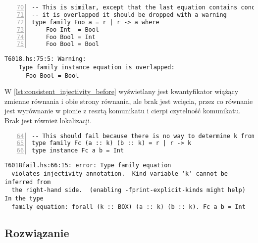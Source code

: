 \begin{lstlisting}[float,numbers=left,firstnumber=70,label={lst:consistent_overlapped_code},
                   caption={Fragment testu T6018 z zamkniętą rodziną typów z równaniami o nachodzących na siebie dziedzinach.}]
-- This is similar, except that the last equation contains concrete type.  Since
-- it is overlapped it should be dropped with a warning
type family Foo a = r | r -> a where
    Foo Int  = Bool
    Foo Bool = Int
    Foo Bool = Bool
\end{lstlisting}

\begin{lstlisting}[float,language={},label={lst:consistent_overlapped_before},
                   caption={Ostrzeżenie generowane przez kompilator w przypadku \ref{lst:consistent_overlapped_code} przed wprowadzeniem zmian.}]
T6018.hs:75:5: Warning:
    Type family instance equation is overlapped:
      Foo Bool = Bool
\end{lstlisting}

W \ref{lst:consistent_injectivity_before} wyświetlany jest kwantyfikator wiążący
zmienne równania i obie strony równania, ale brak jest wcięcia, przez co
równanie jest wyrównanie w pionie z resztą komunikatu i cierpi czytelność
komunikatu. Brak jest również lokalizacji.

\begin{lstlisting}[float,numbers=left,firstnumber=64,label={lst:consistent_injectivity_code},
                   caption={Fragment testu T6018fail z równaniem rodziny typów nie spełniającej warunku różnowartościowości.}]
-- This should fail because there is no way to determine k from the RHS
type family Fc (a :: k) (b :: k) = r | r -> k
type instance Fc a b = Int
\end{lstlisting}

\begin{lstlisting}[float,language={},label={lst:consistent_injectivity_before},
                   caption={Błąd generowany przez kompilator w przypadku
                     \ref{lst:consistent_injectivity_code} przed wprowadzeniem
                     zmian.}]  T6018fail.hs:66:15: error: Type family equation
  violates injectivity annotation.  Kind variable ‘k’ cannot be inferred from
  the right-hand side.  (enabling -fprint-explicit-kinds might help) In the type
  family equation: forall (k :: BOX) (a :: k) (b :: k). Fc a b = Int
\end{lstlisting}


\subsection{Rozwiązanie} %

